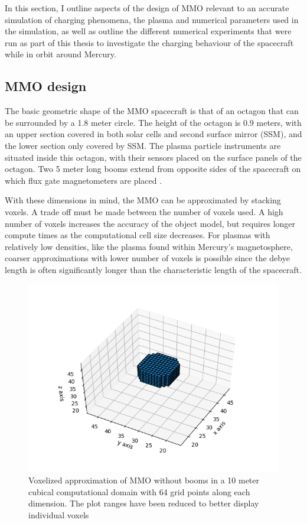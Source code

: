 In this section, I outline aspects of the design of MMO relevant to an accurate simulation of charging phenomena, the plasma and numerical parameters used in the simulation, as well as outline the different numerical experiments that were run as part of this thesis to investigate the charging behaviour of the spacecraft while in orbit around Mercury.  


\subsection{MMO design}

The basic geometric shape of the MMO spacecraft is that of an octagon that can be surrounded by a 1.8 meter circle. The height of the octagon is 0.9 meters, with an upper section covered in both solar cells and second surface mirror (SSM), and the lower section only covered by SSM. The plasma particle instruments are situated inside this octagon, with their sensors placed on the surface panels of the octagon. Two 5 meter long booms extend from opposite sides of the spacecraft on which flux gate magnetometers are placed \parencite{Yamakawa2008}.

With these dimensions in mind, the MMO can be approximated by stacking voxels. A trade off must be made between the number of voxels used. A high number of voxels increases the accuracy of the object model, but requires longer compute times as the computational cell size decreases. For plasmas with relatively low densities, like the plasma found within Mercury's magnetosphere, coarser approximations with lower number of voxels is possible since the debye length is often significantly longer than the characteristic length of the spacecraft. 

\begin{figure}[H]
    \centering
    \includegraphics[scale=0.6]{figures/ReferenceFigures/MMO_no_booms_64.png}
    \caption{Voxelized approximation of MMO without booms in a 10 meter cubical computational domain with 64 grid points along each dimension. The plot ranges have been reduced to better display individual voxels}
    \label{fig:MMOnoBooms}
\end{figure}


